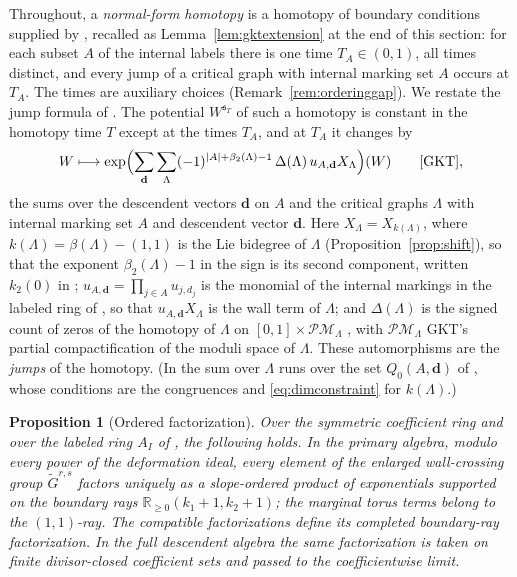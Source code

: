\documentclass[11pt]{amsart}
\newtheorem{proposition}[theorem]{Proposition}
\theoremstyle{definition}
\theoremstyle{remark}
\newcommand{\RR}{\mathbb{R}}
\begin{document}
Throughout, a \emph{normal-form homotopy} is a homotopy of boundary
conditions supplied by \cite[Lem.~3.40]{GKT}, recalled as
Lemma~\ref{lem:gktextension} at the end of this section: for each subset $A$ of the
internal labels there is one time $T_{A}\in(0,1)$, all times distinct, and
every jump of a critical graph with internal marking set $A$ occurs at
$T_{A}$. The times are auxiliary choices (Remark~\ref{rem:orderinggap}).
We restate the jump formula of \cite[proof of Thm.~5.9]{GKT}.  The potential
$W^{\mathfrak s_T}$ of such a homotopy is constant in the homotopy time $T$ except at the times $T_A$,
and at $T_A$ it changes by
\[
W\longmapsto\exp\Bigl(\sum_{\mathbf d}\sum_{\Lambda}
(-1)^{|A|+\beta_2(\Lambda)-1}\,\Delta(\Lambda)\,u_{A,\mathbf d}X_{\Lambda}\Bigr)(W)
\qquad\text{\cite[proof of Thm.~5.9]{GKT}},
\]
the sums over the descendent vectors $\mathbf d$ on $A$ and the critical graphs
$\Lambda$ with internal marking set $A$ and descendent vector $\mathbf d$.
Here $X_\Lambda=X_{k(\Lambda)}$, where $k(\Lambda)=\beta(\Lambda)-(1,1)$ is the
Lie bidegree of $\Lambda$ (Proposition~\ref{prop:shift}), so that the
exponent $\beta_2(\Lambda)-1$ in the sign is its second component, written
$k_2(0)$ in \cite[Not.~5.7]{GKT}; $u_{A,\mathbf d}=\prod_{j\in A}u_{j,d_j}$ is the monomial of
the internal markings in the labeled ring of \cite[Def.~4.6]{GKT}, so that
$u_{A,\mathbf d}X_\Lambda$ is the wall term of $\Lambda$; and $\Delta(\Lambda)$ is
the signed count of zeros of the homotopy of
$\Lambda$ on $[0,1]\times\mathcal{PM}_\Lambda$ \cite[(5.33)]{GKT}, with
$\mathcal{PM}_\Lambda$ GKT's partial compactification of the moduli space of
$\Lambda$.  These
automorphisms are the \emph{jumps} of the homotopy.  (In \cite{GKT} the sum
over $\Lambda$ runs over the set $Q_0(A,\mathbf d)$ of \cite[Not.~5.7]{GKT},
whose conditions are the congruences and \eqref{eq:dimconstraint} for
$k(\Lambda)$.)

\begin{proposition}[Ordered factorization]
\label{prop:ordered}
Over the symmetric coefficient ring and over the labeled ring $A_I$ of
\cite[Def.~4.6]{GKT}, the following holds.  In the primary algebra, modulo
every power of the deformation ideal, every
element of the enlarged wall-crossing group $\widetilde G^{r,s}$ factors
uniquely as a slope-ordered product of exponentials supported on the boundary
rays $\RR_{\ge0}(k_{1}{+}1,k_{2}{+}1)$; the marginal torus terms belong to the
$(1,1)$-ray.  The compatible factorizations define its completed boundary-ray
factorization.  In the full descendent algebra the same factorization is
taken on finite divisor-closed coefficient sets and passed to the
coefficientwise limit.
\end{proposition}
\end{document}
